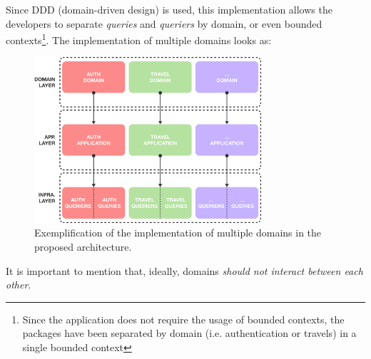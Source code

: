 \documentclass[../design.tex]{subfiles}
\begin{document}
Since DDD (domain-driven design) is used, this implementation allows the
developers to separate \emph{queries} and \emph{queriers} by domain, or even
bounded contexts\footnote{Since the application does not require the usage of
	bounded contexts, the packages have been separated by domain (i.e.
	authentication or travels) in a single bounded context}. The implementation of
multiple domains looks as:
\begin{figure}[H]
	\centering
	\includegraphics[width=0.75\textwidth]{./assets/core-multi-domain.png}
	\caption{Exemplification of the implementation of multiple domains in the
		proposed architecture.}
\end{figure}
It is important to mention that, ideally, domains \emph{should not interact
	between each other}.
\end{document}

